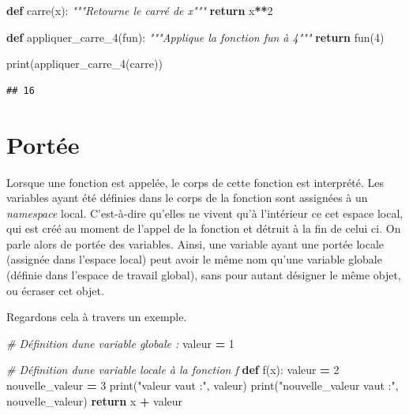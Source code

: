 \documentclass[
  12pt,
]{book}
\newenvironment{Shaded}{\begin{snugshade}}{\end{snugshade}}
\newcommand{\BuiltInTok}[1]{#1}
\newcommand{\CommentTok}[1]{\textcolor[rgb]{0.56,0.35,0.01}{\textit{#1}}}
\newcommand{\ControlFlowTok}[1]{\textcolor[rgb]{0.13,0.29,0.53}{\textbf{#1}}}
\newcommand{\DecValTok}[1]{\textcolor[rgb]{0.00,0.00,0.81}{#1}}
\newcommand{\KeywordTok}[1]{\textcolor[rgb]{0.13,0.29,0.53}{\textbf{#1}}}
\newcommand{\NormalTok}[1]{#1}
\newcommand{\OperatorTok}[1]{\textcolor[rgb]{0.81,0.36,0.00}{\textbf{#1}}}
\newcommand{\StringTok}[1]{\textcolor[rgb]{0.31,0.60,0.02}{#1}}
\numberwithin{equation}{section}
\numberwithin{countremarque}{section}
\begin{document}
\begin{Shaded}
\begin{Highlighting}[]
\KeywordTok{def}\NormalTok{ carre(x):}
  \CommentTok{"""Retourne le carré de x"""}
  \ControlFlowTok{return}\NormalTok{ x}\OperatorTok{**}\DecValTok{2}
  
\KeywordTok{def}\NormalTok{ appliquer\_carre\_4(fun):}
  \CommentTok{"""Applique la fonction \textasciigrave{}fun\textasciigrave{} à 4"""}
  \ControlFlowTok{return}\NormalTok{ fun(}\DecValTok{4}\NormalTok{)}

\BuiltInTok{print}\NormalTok{(appliquer\_carre\_4(carre))}
\end{Highlighting}
\end{Shaded}

\begin{lstlisting}
## 16
\end{lstlisting}

\section{Portée}\label{portuxe9e}

Lorsque une fonction est appelée, le corps de cette fonction est interprété. Les variables ayant été définies dans le corps de la fonction sont assignées à un \emph{namespace} local. C'est-à-dire qu'elles ne vivent qu'à l'intérieur ce cet espace local, qui est créé au moment de l'appel de la fonction et détruit à la fin de celui ci. On parle alors de portée des variables. Ainsi, une variable ayant une portée locale (assignée dans l'espace local) peut avoir le même nom qu'une variable globale (définie dans l'espace de travail global), sans pour autant désigner le même objet, ou écraser cet objet.

Regardons cela à travers un exemple.

\begin{Shaded}
\begin{Highlighting}[]
\CommentTok{\# Définition d\textquotesingle{}une variable globale :}
\NormalTok{valeur }\OperatorTok{=} \DecValTok{1}

\CommentTok{\# Définition d\textquotesingle{}une variable locale à la fonction f}
\KeywordTok{def}\NormalTok{ f(x):}
\NormalTok{  valeur }\OperatorTok{=} \DecValTok{2}
\NormalTok{  nouvelle\_valeur }\OperatorTok{=} \DecValTok{3}
  \BuiltInTok{print}\NormalTok{(}\StringTok{"valeur vaut :"}\NormalTok{, valeur)}
  \BuiltInTok{print}\NormalTok{(}\StringTok{"nouvelle\_valeur vaut :"}\NormalTok{, nouvelle\_valeur)}
  \ControlFlowTok{return}\NormalTok{ x }\OperatorTok{+}\NormalTok{ valeur}
\end{Highlighting}
\end{Shaded}
\end{document}
